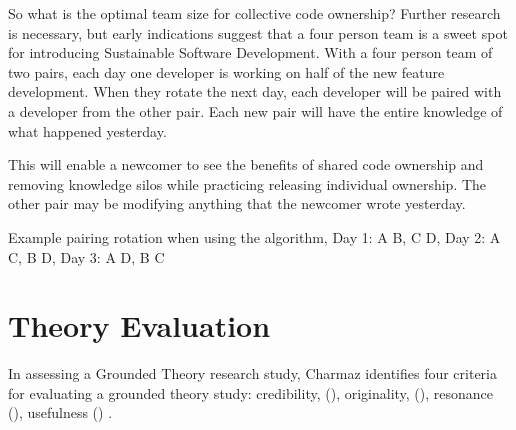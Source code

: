 So what is the optimal team size for collective code ownership? Further research is necessary, but early indications suggest that a four person team is a sweet spot for introducing Sustainable Software Development. With a four person team of two pairs, each day one developer is working on half of the new feature development. When they rotate the next day, each developer will be paired with a developer from the other pair. Each new pair will have the entire knowledge of what happened yesterday. 

This will enable a newcomer to see the benefits of shared code ownership and removing knowledge silos while practicing releasing individual ownership. The other pair may be modifying anything that the newcomer wrote yesterday. 

Example pairing rotation when using the algorithm, 
Day 1: A B, C D,
Day 2: A C, B D,
Day 3: A D, B C

\section{Theory Evaluation}
\label{TheoryEvaluation}

In assessing a Grounded Theory research study, Charmaz identifies four criteria for evaluating a grounded theory study: credibility, (), originality, (), resonance (), usefulness () \cite{StolGTinSE}. 

